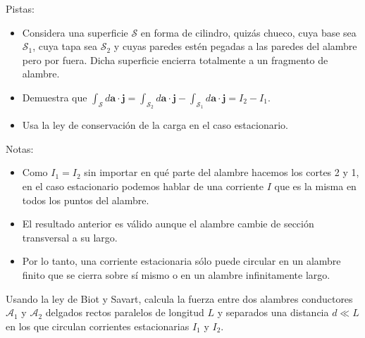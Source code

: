 \documentclass{exam}
\begin{document}
\begin{questions}
    Pistas:
    \begin{itemize}
    \item Considera una superficie $\mathcal S$ en forma de cilindro,
      quizás chueco, cuya base sea
      $\mathcal S_1$, cuya tapa sea $\mathcal S_2$ y cuyas paredes
      estén pegadas a las paredes del alambre pero por fuera. Dicha
      superficie encierra totalmente a un fragmento de alambre.
    \item Demuestra que $\int_{\mathcal S}d\bm a\cdot\bm
      j=\int_{\mathcal S_2}d\bm a\cdot\bm j - \int_{\mathcal
        S_1}d\bm a\cdot\bm j=I_2-I_1$.
    \item Usa la ley de conservación de la carga en el caso estacionario.
    \end{itemize}
    Notas:
    \begin{itemize}
    \item Como $I_1=I_2$ sin importar en qué parte del alambre hacemos
      los cortes 2 y 1, en el caso estacionario podemos hablar de una
      corriente $I$ que es la misma en todos los puntos del alambre.
    \item El resultado anterior es válido aunque el alambre cambie de
      sección transversal a su largo.
    \item Por lo tanto, una corriente estacionaria sólo puede circular
      en un alambre finito que se cierra sobre sí mismo o en un
      alambre infinitamente largo.
    \end{itemize}


  \question Usando la ley de Biot y Savart, calcula la fuerza entre
    dos alambres conductores $\mathcal A_1$ y $\mathcal A_2$ delgados
    rectos paralelos de longitud $L$ y
    separados una distancia $d\ll L$ en los que circulan corrientes
    estacionarias $I_1$ y $I_2$.


\end{questions}
\end{document}
